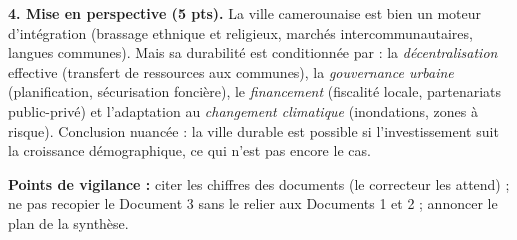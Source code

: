 \documentclass[11pt]{article}
\begin{document}
\begin{corrige}
\textbf{4. Mise en perspective (5 pts).} La ville camerounaise est bien un moteur d'intégration (brassage ethnique et religieux, marchés intercommunautaires, langues communes). Mais sa durabilité est conditionnée par : la \emph{décentralisation} effective (transfert de ressources aux communes), la \emph{gouvernance urbaine} (planification, sécurisation foncière), le \emph{financement} (fiscalité locale, partenariats public-privé) et l'adaptation au \emph{changement climatique} (inondations, zones à risque). Conclusion nuancée : la ville durable est possible si l'investissement suit la croissance démographique, ce qui n'est pas encore le cas.

\textbf{Points de vigilance :} citer les chiffres des documents (le correcteur les attend) ; ne pas recopier le Document 3 sans le relier aux Documents 1 et 2 ; annoncer le plan de la synthèse.
\end{corrige}
\end{document}
